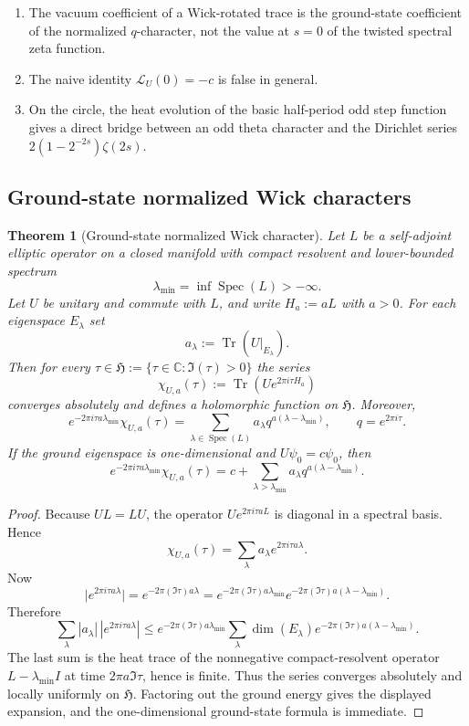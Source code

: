 \documentclass[11pt,a4paper]{article}
\numberwithin{equation}{section}
\newtheorem{theorem}{Theorem}[section]
\theoremstyle{definition}
\theoremstyle{remark}
\newcommand{\CC}{\mathbb C}
\begin{document}
\begin{enumerate}[label=(\arabic*)]
\item The vacuum coefficient of a Wick-rotated trace is the ground-state coefficient of the normalized $q$-character, not the value at $s=0$ of the twisted spectral zeta function.
\item The naive identity $\mathcal L_U(0)=-c$ is false in general.
\item On the circle, the heat evolution of the basic half-period odd step function gives a direct bridge between an odd theta character and the Dirichlet series $2(1-2^{-2s})\zeta(2s)$.
\end{enumerate}

\subsection{Ground-state normalized Wick characters}

\begin{theorem}[Ground-state normalized Wick character]\label{thm:wick-character}
Let $L$ be a self-adjoint elliptic operator on a closed manifold with compact resolvent and lower-bounded spectrum
\[
\lambda_{\min}=\inf\operatorname{Spec}(L)>-\infty.
\]
Let $U$ be unitary and commute with $L$, and write $H_a:=aL$ with $a>0$.  For each eigenspace $E_\lambda$ set
\[
a_\lambda:=\operatorname{Tr}(U|_{E_\lambda}).
\]
Then for every $\tau\in\mathfrak H:=\{\tau\in\CC:\Im(\tau)>0\}$ the series
\[
\chi_{U,a}(\tau):=\operatorname{Tr}(Ue^{2\pi i\tau H_a})
\]
converges absolutely and defines a holomorphic function on $\mathfrak H$.  Moreover,
\[
e^{-2\pi i\tau a\lambda_{\min}}\chi_{U,a}(\tau)
=
\sum_{\lambda\in\operatorname{Spec}(L)} a_\lambda q^{a(\lambda-\lambda_{\min})},
\qquad q=e^{2\pi i\tau}.
\]
If the ground eigenspace is one-dimensional and $U\psi_0=c\psi_0$, then
\[
e^{-2\pi i\tau a\lambda_{\min}}\chi_{U,a}(\tau)
=
c+\sum_{\lambda>\lambda_{\min}} a_\lambda q^{a(\lambda-\lambda_{\min})}.
\]
\end{theorem}

\begin{proof}
Because $UL=LU$, the operator $Ue^{2\pi i\tau aL}$ is diagonal in a spectral basis.  Hence
\[
\chi_{U,a}(\tau)=\sum_{\lambda} a_\lambda e^{2\pi i\tau a\lambda}.
\]
Now
\[
\bigl|e^{2\pi i\tau a\lambda}\bigr|=e^{-2\pi(\Im\tau)a\lambda}
=e^{-2\pi(\Im\tau)a\lambda_{\min}}e^{-2\pi(\Im\tau)a(\lambda-\lambda_{\min})}.
\]
Therefore
\[
\sum_\lambda |a_\lambda|\,|e^{2\pi i\tau a\lambda}|
\le e^{-2\pi(\Im\tau)a\lambda_{\min}}
\sum_\lambda \dim(E_\lambda)e^{-2\pi(\Im\tau)a(\lambda-\lambda_{\min})}.
\]
The last sum is the heat trace of the nonnegative compact-resolvent operator $L-\lambda_{\min}I$ at time $2\pi a\Im\tau$, hence is finite.  Thus the series converges absolutely and locally uniformly on $\mathfrak H$.  Factoring out the ground energy gives the displayed expansion, and the one-dimensional ground-state formula is immediate.
\end{proof}
\end{document}
